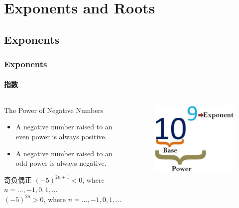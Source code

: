 \documentclass[
	11pt, %
	handout,
]{beamer}
\begin{document}
\section{Exponents and Roots}
\subsection{Exponents}

\begin{frame}
\frametitle{Exponents}
\framesubtitle{指数}

	\begin{columns}[c] %
		\begin{column}{0.45\textwidth} %
				\begin{alertblock}{The Power of Negative Numbers}
						\begin{itemize}
							\item A negative number raised to an even power is always positive.
							\item A negative number raised to an odd power is always negative. 
					\end{itemize}
			 \end{alertblock}
	\begin{exampleblock}{奇负偶正}
		$(-5)^{2n + 1} <0 $, where $n =\ldots, -1, 0 , 1, \ldots$ \\
		$(-5)^{2n } > 0 $, where $n =\ldots, -1, 0 , 1, \ldots$ \\
	\end{exampleblock}

		\end{column}
		\begin{column}{0.5\textwidth} %
		\begin{figure}
		\includegraphics[width=0.5\linewidth]{exponent-vs-power.jpeg}
	\end{figure}
		\end{column}
	\end{columns}
	
\end{frame}
\end{document}
